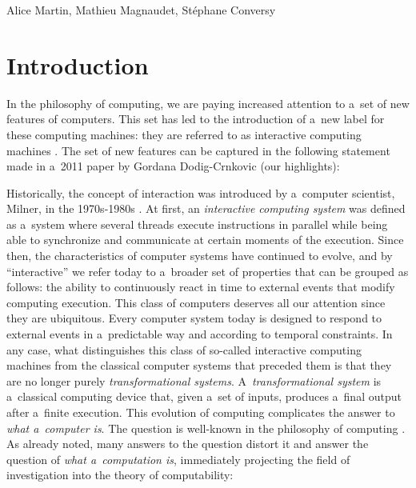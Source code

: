 \begin{artengenv2auth}{Alice Martin, Mathieu Magnaudet, Stéphane Conversy}
\section*{Introduction}

In the philosophy of computing, we are paying increased attention to a~set of new features of computers. This set has led to the introduction of a~new label for these computing machines: they are referred to as interactive computing machines \parencite{Dodig-Crnkovic2011, Goldin2006, Soare2013, VanLeeuwen2001, Wegner1997}. The set of new features can be captured in the following statement made in a~2011 paper by Gordana Dodig-Crnkovic (our highlights): 


Historically, the concept of interaction was introduced by a~computer scientist, Milner, in the 1970s-1980s \parencite{Milner1975, Milner1982, Milner1993, Milner1999}. At first, an \emph{interactive computing system} was defined as a~system where several threads execute instructions in parallel while being able to synchronize and communicate at certain moments of the execution. Since then, the characteristics of computer systems have continued to evolve, and by ``interactive'' we refer today to a~broader set of properties that can be grouped as follows: the ability to continuously react in time to external events that modify computing execution. 
This class of computers deserves all our attention since they are ubiquitous. Every computer system today is designed to respond to external events in a~predictable way and according to temporal constraints. In any case, what distinguishes this class of so-called interactive computing machines from the classical computer systems that preceded them is that they are no longer purely \emph{transformational systems}. A~\emph{transformational system} is a~classical computing device that, given a~set of inputs, produces a~final output after a~finite execution. 
This evolution of computing complicates the answer to \textit{what a~computer is}. The question is well-known in the philosophy of computing \parencite{Piccinini2008, Rapaport2018, Smith2002}. As already noted, many answers to the question distort it and answer the question of \textit{what a~computation is}, immediately projecting the field of investigation into the theory of computability: 



\end{artengenv2auth}
